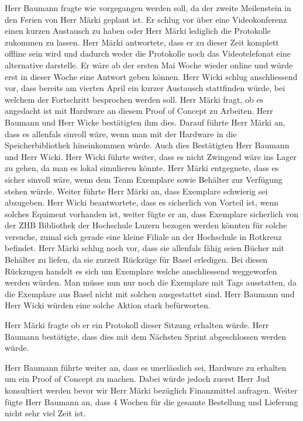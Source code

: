 \documentclass[parskip=full, a4paper]{scrreprt}
\begin{document}
Herr Baumann fragte wie vorgegangen werden soll, da der zweite Meilenstein in den Ferien von Herr Märki geplant ist. Er schlug vor über eine Videokonferenz einen kurzen Austausch zu haben oder Herr Märki lediglich die Protokolle zukommen zu lassen.
Herr Märki antwortete, dass er zu dieser Zeit komplett offline sein wird und dadurch weder die Protokolle noch das Videotelefonat eine alternative darstelle. Er wäre ab der ersten Mai Woche wieder online und würde erst in dieser Woche eine Antwort geben können.
Herr Wicki schlug anschliessend vor, dass bereits am vierten April ein kurzer Austausch stattfinden würde, bei welchem der Fortschritt besprochen werden soll. 
Herr Märki fragt, ob es angedacht ist mit Hardware an diesem Proof of Concept zu Arbeiten. Herr Baumann und Herr Wicke bestätigten ihm dies. Darauf führte Herr Märki an, dass es allenfals sinvoll wäre, wenn man mit der Hardware in die Speicherbibliothek hineinkommen würde. Auch dies Bestätigten Herr Baumann und Herr Wicki. Herr Wicki führte weiter, dass es nicht Zwingend wäre ins Lager zu gehen, da man es lokal simulieren könnte. 
Herr Märki entgegnete, dass es sicher sinvoll wäre, wenn dem Team Exemplare sowie Behälter zur Verfügung stehen würde. Weiter führte Herr Märki an, dass Exemplare schwierig sei abzugeben. Herr Wicki beantwortete, dass es sicherlich von Vorteil ist, wenn solches Equiment vorhanden ist, weiter fügte er an, dass Exemplare sicherlich von der ZHB Bibliothek der Hochschule Luzern bezogen werden könnten für solche versuche, zumal sich gerade eine kleine Filiale an der Hochschule in Rotkreuz befindet.
Herr Märki schlug noch vor, dass sie allenfals fähig seien Bücher mit Behälter zu liefen, da sie zurzeit Rückzüge für Basel erledigen. Bei diesen Rückzugen handelt es sich um Exemplare welche anschliessend weggeworfen werden würden. Man müsse nun nur noch die Exemplare mit Tags ausstatten, da die Exemplare aus Basel nicht mit solchen ausgestattet sind.
Herr Baumann und Herr Wicki würden eine solche Aktion stark befürworten.

Herr Märki fragte ob er ein Protokoll dieser Sitzung erhalten würde. Herr Baumann bestätigte, dass dies mit dem Nächsten Sprint abgeschlossen werden würde.

Herr Baumann führte weiter an, dass es unerlässlich sei, Hardware zu erhalten um ein Proof of Concept zu machen. Dabei würde jedoch zuerst Herr Jud konsultiert werden bevor wir Herr Märki bezüglich Finanzmittel anfragen.
Weiter fügte Herr Baumann an, dass 4 Wochen für die gesamte Bestellung und Lieferung nicht sehr viel Zeit ist. 
\end{document}
